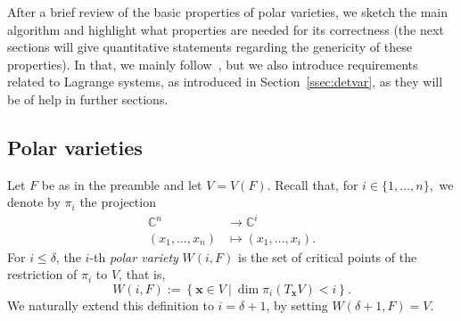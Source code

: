 \documentclass[12pt]{article}
\def\xb{{\bm x}}
\def\C{\mathbb{C}}
\begin{document}
After a brief review of the basic properties of polar varieties, we
sketch the main algorithm and highlight what properties are needed for
its correctness (the next sections will give quantitative statements
regarding the genericity of these properties). In that, we mainly
follow~\cite{EMP}, but we also introduce requirements related to
Lagrange systems, as introduced in Section~\ref{ssec:detvar}, as they
will be of help in further sections.


\subsection{Polar varieties}

Let $F$ be as in the preamble and let $V=V(F)$. Recall that, for $i
\in \{1,\hdots,n\},$ we denote by $\pi_i$ the projection
\begin{align*}
  \C^n &\rightarrow \C^i \\
  (x_1,\hdots,x_n) &\mapsto  (x_1,\hdots,x_i).    
\end{align*} 
For $i \le \delta$, the $i$-th \textit{polar variety} $W(i,F)$  is
the set of critical points of the restriction of $\pi_i$ to $V$, that
is,
\[W(i,F) := \left\{\xb \in V~|~\dim \pi_i(T_\xb V) < i\right\}.\]
We naturally extend this definition to $i=\delta+1$, by setting
$W({\delta+1},F)=V$.
\end{document}
